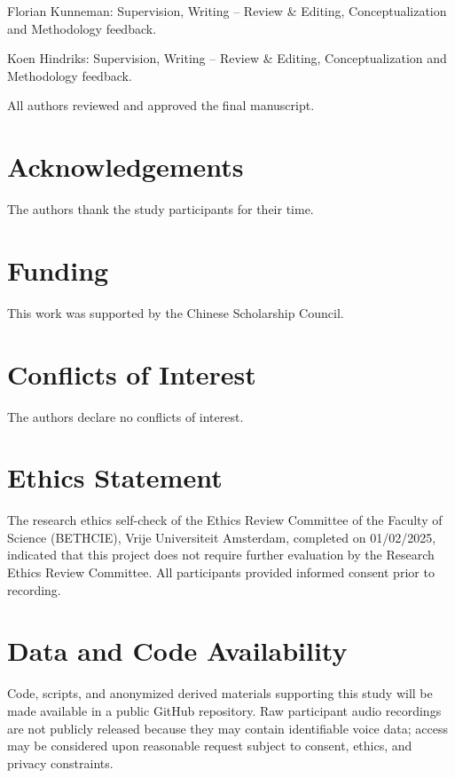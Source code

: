 \documentclass[11pt]{article}
\begin{document}
Florian Kunneman: Supervision, Writing -- Review \& Editing, Conceptualization
and Methodology feedback.

Koen Hindriks: Supervision, Writing -- Review \& Editing, Conceptualization and
Methodology feedback.

All authors reviewed and approved the final manuscript.

\section*{Acknowledgements}

The authors thank the study participants for their time.

\section*{Funding}

This work was supported by the Chinese Scholarship Council.

\section*{Conflicts of Interest}

The authors declare no conflicts of interest.

\section*{Ethics Statement}

The research ethics self-check of the Ethics Review Committee of the Faculty of
Science (BETHCIE), Vrije Universiteit Amsterdam, completed on 01/02/2025,
indicated that this project does not require further evaluation by the Research
Ethics Review Committee. All participants provided informed consent prior to
recording.

\section*{Data and Code Availability}

Code, scripts, and anonymized derived materials supporting this study will be
made available in a public GitHub repository. Raw participant audio recordings
are not publicly released because they may contain identifiable voice data;
access may be considered upon reasonable request subject to consent, ethics, and
privacy constraints.
\end{document}
